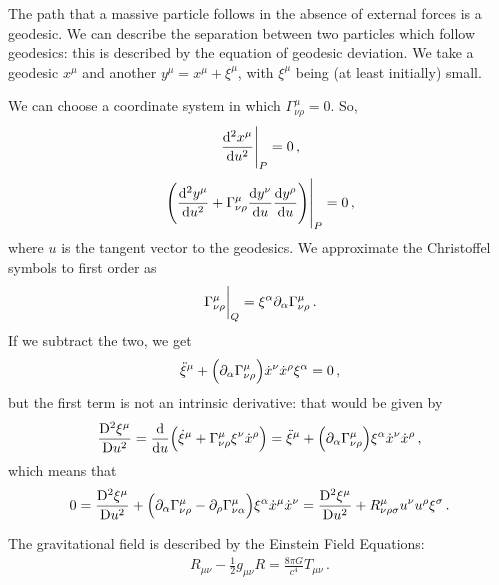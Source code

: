 \documentclass[main.tex]{subfiles}
\begin{document}
The path that a massive particle follows in the absence of external forces is a geodesic. 
We can describe the separation between two particles which follow geodesics: this is described by the equation of geodesic deviation. 
We take a geodesic \(x^{\mu }\) and another \(y^{\mu } = x^{\mu }+ \xi^{\mu }\), with \(\xi^{\mu }\) being (at least initially) small. 

We can choose a coordinate system in which \(\Gamma^{\mu }_{\nu \rho } =0\). So, 
%
\begin{align}
\eval{\dv[2]{x^{\mu }}{u}}_{P} = 0
\,,
\end{align} 
%
\begin{align}
\eval{\qty(\dv[2]{y^{\mu }}{u} + \Gamma^{\mu }_{\nu \rho } \dv{y^{\nu }}{u} \dv{y^{\rho }}{u})}_{P} = 0
\,,
\end{align}
%
where \(u\) is the tangent vector to the geodesics. We approximate the Christoffel symbols to first order as 
%
\begin{align}
\eval{\Gamma^{\mu }_{\nu \rho }}_{Q} = \xi^{\alpha } \partial_{\alpha } \Gamma^{\mu }_{\nu \rho }
\,.
\end{align}
%
If we subtract the two, we get 
%
\begin{align}
\ddot{\xi}^{\mu } + \qty(\partial_{\alpha } \Gamma^{\mu }_{\nu \rho }) \dot{x}^{\nu } \dot{x}^{\rho } \xi^{\alpha } = 0
\,,
\end{align}
%
but the first term is not an intrinsic derivative: that would be given by 
%
\begin{align}
\frac{\mathrm{D}^2 \xi^{\mu }}{\mathrm{D} u^2} 
= \dv{}{u} \qty(\dot{\xi}^{\mu } + \Gamma^{\mu }_{\nu \rho } \xi^{\nu } \dot{x}^{\rho }) = \ddot{\xi}^{\mu }+ \qty(\partial_{\alpha } \Gamma^{\mu }_{\nu \rho }) \xi^{\alpha } \dot{x}^{\nu } \dot{x}^{\rho }
\,,
\end{align}
%
which means that 
%
\begin{align}
0= \frac{\mathrm{D}^2 \xi^{\mu }}{\mathrm{D} u^2} 
+ \qty(\partial_{\alpha } \Gamma^{\mu }_{\nu \rho } - \partial_{\rho } \Gamma^{\mu }_{\nu \alpha }) \xi^{\alpha } \dot{x}^{\mu } \dot{x}^{\nu }
= \frac{\mathrm{D}^2 \xi^{\mu }}{\mathrm{D} u^2} 
+ R^{\mu }_{\nu \rho \sigma } u^{\nu } u^{\rho } \xi ^{\sigma }
\,.
\end{align}

The gravitational field is described by the Einstein Field Equations: 
%
\begin{align}
R_{\mu \nu } - \frac{1}{2} g_{\mu \nu } R = \frac{8 \pi G}{c^{4}} T_{\mu \nu } 
\,.
\end{align}
\end{document}
